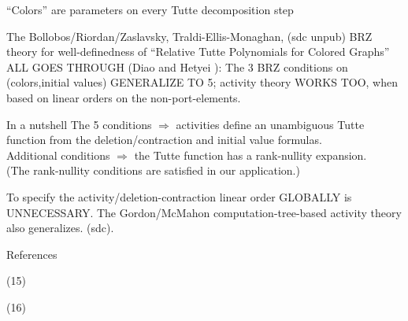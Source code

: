 \documentclass{beamer}
\newcommand{\Remph}[1]{{\color{red}#1}}
\begin{document}
\begin{frame}{``Colors'' are parameters on every Tutte decomposition step}

The Bollobos/Riordan/Zaslavsky\cite{BollobasRiordanTuttePolyColored,MR93a:05047}, Traldi-Ellis-Monaghan\cite{Ellis-Monaghan-Traldi}, (sdc unpub)
BRZ theory for well-definedness
of ``Relative Tutte Polynomials for Colored Graphs'' ALL GOES THROUGH 
(Diao and Hetyei \cite{RelTuttePoly}):
The 3 BRZ conditions on (colors,initial values) GENERALIZE TO 5;
activity theory WORKS TOO, when
based on linear orders on the non-port-elements.

\begin{block}{In a nutshell}
The 5 conditions $\Longrightarrow$ activities define an 
unambiguous Tutte function 
from the deletion/contraction and initial value formulas.\\

Additional conditions $\Longrightarrow$ the Tutte function has a rank-nullity
expansion.\\

\Remph{
(The rank-nullity conditions are satisfied in our application.)}
\end{block}

\begin{block}{To specify the activity/deletion-contraction linear 
order GLOBALLY is 
UNNECESSARY.}
The Gordon/McMahon computation-tree-based 
activity theory also generalizes. (sdc).
\end{block}
\end{frame}


\begin{frame}[allowframebreaks]{References}

{}
\end{frame}




\begin{frame}{(15)}

\end{frame}

\begin{frame}{(16)}
\end{frame}
\end{document}
